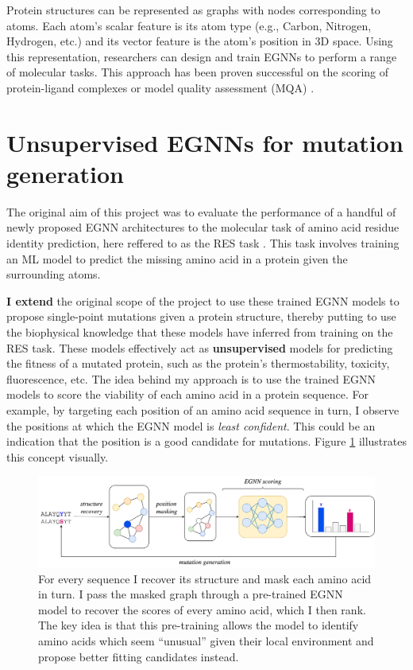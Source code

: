 Protein structures can be represented as graphs with nodes corresponding to atoms. Each atom's scalar feature is its atom type (e.g., Carbon, Nitrogen, Hydrogen, etc.) and its vector feature is the atom's position in 3D space. Using this representation, researchers can design and train EGNNs to perform a range of molecular tasks. This approach has been proven successful on the scoring of protein-ligand complexes \cite{egnn-application-1} or model quality assessment (MQA) \cite{gvp1}.

\section{Unsupervised EGNNs for mutation generation}

The original aim of this project was to evaluate the performance of a handful of newly proposed EGNN architectures to the molecular task of amino acid residue identity prediction, here reffered to as the RES task \cite{atom-3d}. This task involves training an ML model to predict the missing amino acid in a protein given the surrounding atoms.

\textbf{I extend} the original scope of the project to use these trained EGNN models to propose single-point mutations given a protein structure, thereby putting to use the biophysical knowledge that these models have inferred from training on the RES task. These models effectively act as \textbf{unsupervised} models for predicting the fitness of a mutated protein, such as the protein's thermostability, toxicity, fluorescence, etc. The idea behind my approach is to use the trained EGNN models to score the viability of each amino acid in a protein sequence. For example, by targeting each position of an amino acid sequence in turn, I observe the positions at which the EGNN model is \textit{least confident}. This could be an indication that the position is a good candidate for mutations. Figure \ref{idea} illustrates this concept visually.

\begin{figure}[!h]
    \centering
    \includegraphics[width=\textwidth]{masters-report/figures/pipeline-4.png}
    \caption{For every sequence I recover its structure and mask each amino acid in turn. I pass the masked graph through a pre-trained EGNN model to recover the scores of every amino acid, which I then rank.  The key idea is that this pre-training allows the model to identify amino acids which seem “unusual” given their local environment and propose better fitting candidates instead.}
    \label{idea}
\end{figure}

